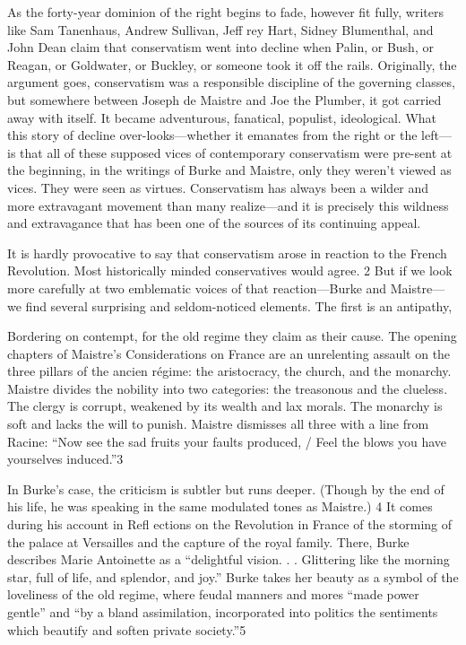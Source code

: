 As the forty-year dominion of the right begins to fade, however fit fully, writers like Sam Tanenhaus, Andrew Sullivan, Jeff rey Hart, Sidney Blumenthal, and John Dean claim that conservatism went into decline when Palin, or Bush, or Reagan, or Goldwater, or Buckley, or someone took it off the rails. Originally, the argument goes, conservatism was a responsible discipline of the governing classes, but somewhere between Joseph de Maistre and Joe the Plumber, it got carried away with itself. It became adventurous, fanatical, populist, ideological. What this story of decline over-looks—whether it emanates from the right or the left—is that all of these supposed vices of contemporary conservatism were pre-sent at the beginning, in the writings of Burke and Maistre, only they weren’t viewed as vices. They were seen as virtues. Conservatism has always been a wilder and more extravagant movement than many realize—and it is precisely this wildness and extravagance that has been one of the sources of its continuing appeal.
 \par 
It is hardly provocative to say that conservatism arose in reaction to the French Revolution. Most historically minded conservatives would agree. {\color{blue}2} But if we look more carefully at two emblematic voices of that reaction—Burke and Maistre—we find several surprising and seldom-noticed elements. The first is an antipathy,
 \par 
Bordering on contempt, for the old regime they claim as their cause. The opening chapters of Maistre’s Considerations on France are an unrelenting assault on the three pillars of the ancien régime: the aristocracy, the church, and the monarchy. Maistre divides the nobility into two categories: the treasonous and the clueless. The clergy is corrupt, weakened by its wealth and lax morals. The monarchy is soft and lacks the will to punish. Maistre dismisses all three with a line from Racine: “Now see the sad fruits your faults produced, / Feel the blows you have yourselves induced.”{\color{blue}3}
 \par 
In Burke’s case, the criticism is subtler but runs deeper. (Though by the end of his life, he was speaking in the same modulated tones as Maistre.) {\color{blue}4} It comes during his account in Refl ections on the Revolution in France of the storming of the palace at Versailles and the capture of the royal family. There, Burke describes Marie Antoinette as a “delightful vision. . . Glittering like the morning star, full of life, and splendor, and joy.” Burke takes her beauty as a symbol of the loveliness of the old regime, where feudal manners and mores “made power gentle” and “by a bland assimilation, incorporated into politics the sentiments which beautify and soften private society.”{\color{blue}5}
